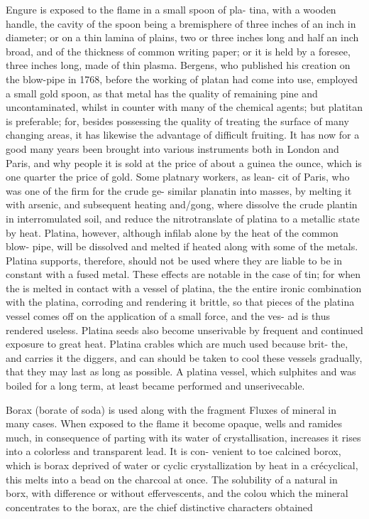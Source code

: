 \documentclass{article}
\begin{document}
Engure is exposed to the flame in a small spoon of pla- tina, with a wooden handle, the cavity of the spoon being a bremisphere of three inches of an inch in diameter; or on a thin lamina of plains, two or three inches long and half an inch broad, and of the thickness of common writing paper; or it is held by a foresee, three inches long, made of thin plasma. Bergens, who published his creation on the blow-pipe in 1768, before the working of platan had come into use, employed a small gold spoon, as that metal has the quality of remaining pine and uncontaminated, whilst in counter with many of the chemical agents; but platitan is preferable; for, besides possessing the quality of treating the surface of many changing areas, it has likewise the advantage of difficult fruiting. It has now for a good many years been brought into various instruments both in London and Paris, and why people it is sold at the price of about a guinea the ounce, which is one quarter the price of gold. Some platnary workers, as lean- cit of Paris, who was one of the firm for the crude ge- similar planatin into masses, by melting it with arsenic, and subsequent heating and/gong, where dissolve the crude plantin in interromulated soil, and reduce the nitrotranslate of platina to a metallic state by heat. Platina, however, although infilab alone by the heat of the common blow- pipe, will be dissolved and melted if heated along with some of the metals. Platina supports, therefore, should not be used where they are liable to be in constant with a fused metal. These effects are notable in the case of tin; for when the is melted in contact with a vessel of platina, the the entire ironic combination with the platina, corroding and rendering it brittle, so that pieces of the platina vessel comes off on the application of a small force, and the ves- ad is thus rendered useless. Platina seeds also become unserivable by frequent and continued exposure to great heat. Platina crables which are much used because brit- the, and carries it the diggers, and can should be taken to cool these vessels gradually, that they may last as long as possible. A platina vessel, which sulphites and was boiled for a long term, at least became performed and unserivecable.

Borax (borate of soda) is used along with the fragment Fluxes of mineral in many cases. When exposed to the flame it become opaque, wells and ramides much, in consequence of parting with its water of crystallisation, increases it rises into a colorless and transparent lead. It is con- venient to toe calcined borox, which is borax deprived of water or cyclic crystallization by heat in a crécyclical, this melts into a bead on the charcoal at once. The solubility of a natural in borx, with difference or without effervescents, and the colou which the mineral concentrates to the borax, are the chief distinctive characters obtained
\end{document}
